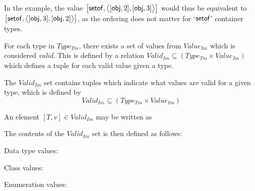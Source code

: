 In the example, the value $\big[ \type{setof}, \big\langle [ \type{obj}, 2 ], [ \type{obj}, 3 ] \big\rangle \big]$ would thus be equivalent to $\big[ \type{setof}, \big\langle [ \type{obj}, 3 ], [ \type{obj}, 2 ] \big\rangle \big]$, as the ordering does not matter for `$\type{setof}$' container types.

For each type in $Type_{Tm}$, there exists a set of values from $Value_{Im}$ which is considered \textit{valid}. This is
defined by a relation $Valid_{Im} \subseteq (Type_{Tm} \times Value_{Im})$ which defines a tuple for each valid value given a type.

\begin{defin}
\label{defin:formalisations:ecore_formalisation:instance_models:valid_type_values}
The $Valid_{Im}$ set contains tuples which indicate what values are valid for a given type, which is defined by
\begin{equation*}
    Valid_{Im} \subseteq (Type_{Tm} \times Value_{Im})
\end{equation*}

An element $[ T, v ] \in Valid_{Im}$ may be written as
\begin{mathpar}
\end{mathpar}

The contents of the $Valid_{Im}$ set is then defined as follows:

Data type values:

Class values:

Enumeration values:
\begin{mathpar}
\end{mathpar}


\end{defin}
